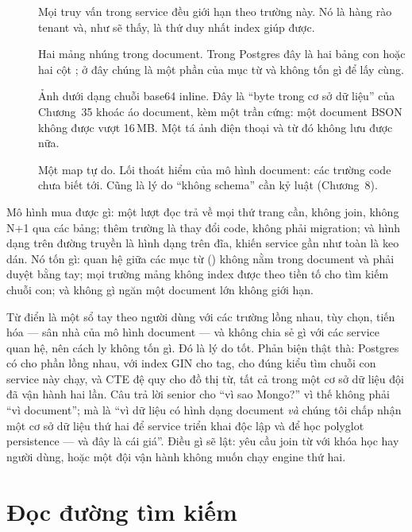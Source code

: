 \begin{description}
  \item[] Mọi truy vấn trong service đều giới hạn theo trường
  này. Nó là hàng rào tenant và, như sẽ thấy, là thứ duy nhất index
  giúp được.
  \item[] Hai mảng nhúng trong document. Trong Postgres đây là
  hai bảng con hoặc hai cột ; ở đây chúng là một phần của
  mục từ và không tốn gì để lấy cùng.
  \item[] Ảnh dưới dạng chuỗi base64 inline. Đây là ``byte trong
  cơ sở dữ liệu'' của Chương~35 khoác áo document, kèm một trần cứng:
  một document BSON không được vượt 16\,MB. Một tá ảnh điện thoại và
  từ đó không lưu được nữa.
  \item[] Một map tự do. Lối thoát hiểm của mô hình document: các
  trường code chưa biết tới. Cũng là lý do ``không schema'' cần kỷ luật
  (Chương~8).
\end{description}

Mô hình mua được gì: một lượt đọc trả về mọi thứ trang cần, không join,
không N+1 qua các bảng; thêm trường là thay đổi code, không phải
migration; và hình dạng trên đường truyền là hình dạng trên đĩa, khiến
service gần như toàn là keo dán. Nó tốn gì: quan hệ giữa các mục từ
() không nằm trong document và phải duyệt bằng tay; mọi
trường mảng không index được theo tiền tố cho tìm kiếm chuỗi con; và
không gì ngăn một document lớn không giới hạn.

\begin{decision}
Từ điển là một sổ tay theo người dùng với các trường lồng nhau, tùy
chọn, tiến hóa --- sân nhà của mô hình document --- và không chia sẻ gì
với các service quan hệ, nên cách ly không tốn gì. Đó là lý do tốt.
Phản biện thật thà: Postgres có  cho phần lồng nhau,
 với index GIN cho tag,  cho đúng kiểu tìm
chuỗi con service này chạy, và CTE đệ quy cho đồ thị từ, tất cả trong
một cơ sở dữ liệu đội đã vận hành hai lần. Câu trả lời senior cho ``vì
sao Mongo?'' vì thế không phải ``vì document''; mà là ``vì dữ liệu có
hình dạng document \emph{và} chúng tôi chấp nhận một cơ sở dữ liệu thứ
hai để service triển khai độc lập và để học polyglot persistence --- và
đây là cái giá''. Điều gì sẽ lật: yêu cầu join từ với khóa học hay
người dùng, hoặc một đội vận hành không muốn chạy engine thứ hai.
\end{decision}

\section{Đọc đường tìm kiếm}

